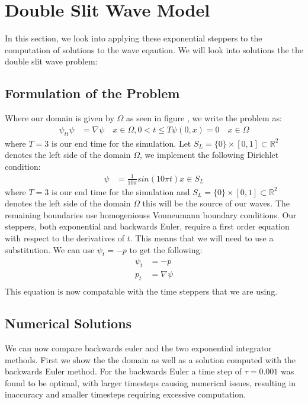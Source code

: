 \section{Double Slit Wave Model}

In this section, we look into applying these exponential steppers to the computation of solutions to the wave eqaution.
We will look into solutions the the double slit wave problem:

\subsection{Formulation of the Problem}
Where our domain is given by $\Omega$ as seen in figure \cite{fig:waveOmega}, we write the problem as:
\begin{align*}
    \psi_{tt}\psi &= \nabla \psi \quad x \in \Omega, 0<t\leq T
    \psi(0,x) = 0 \quad x \in \Omega
\end{align*}
where $T=3$ is our end time for the simulation.
Let $S_L = \{0\} \times [0,1] \subset \mathbb{R}^2$ denotes the left side of the domain $\Omega$, we implement the following Dirichlet condition:
\begin{align*}
    \psi &= \frac{1}{10\pi} sin(10\pi t) x \in S_L
\end{align*}
where $T=3$ is our end time for the simulation and $S_L = \{0\} \times [0,1] \subset \mathbb{R}^2$ denotes the left side of the domain $\Omega$ this will be the source of our waves.
The remaining boundaries use homogeniouss Vonneumann boundary conditions.
Our steppers, both exponential and backwards Euler, require a first order equation with respect to the derivatives of $t$.
This means that we will need to use a substitution.
We can use $\psi_t = -p$ to get the following:
\begin{align*}
    \psi_t &= -p\\
    p_t &= \nabla \psi\\
\end{align*}
This equation is now compatable with the time steppers that we are using.

\subsection{Numerical Solutions}
We can now compare backwards euler and the two exponential integrator methods.
First we show the the domain as well as a solution computed with the backwards Euler method.
For the backwards Euler a time step of $\tau = 0.001$ was found to be optimal, with larger timesteps causing numerical issues, resulting in inaccuracy and smaller timesteps requiring excessive computation.


